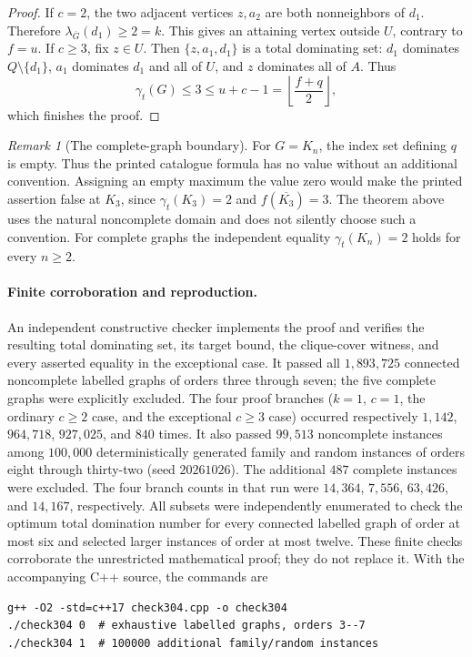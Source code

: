 \documentclass[11pt,a4paper]{article}
\theoremstyle{remark}
\newtheorem{remark}[theorem]{Remark}
\begin{document}
\begin{proof}
If $c=2$, the two adjacent vertices $z,a_2$ are both
nonneighbors of $d_1$. Therefore
$\lambda_{\overline G}(d_1)\ge2=k$. This gives an attaining
vertex outside $U$, contrary to $f=u$.
If $c\ge3$, fix $z\in U$. Then $\{z,a_1,d_1\}$ is a total
dominating set: $d_1$ dominates $Q\setminus\{d_1\}$,
$a_1$ dominates $d_1$ and all of $U$, and $z$ dominates all
of $A$. Thus
\[
 \gamma_t(G)\le3\le u+c-1
   =\left\lfloor\frac{f+q}{2}\right\rfloor,
\]
which finishes the proof.
\end{proof}

\begin{remark}[The complete-graph boundary]
For $G=K_n$, the index set defining $q$ is empty. Thus the
printed catalogue formula has no value without an additional
convention. Assigning an empty maximum the value zero would make
the printed assertion false at $K_3$, since $\gamma_t(K_3)=2$
and $f(\overline{K_3})=3$. The theorem above uses the natural
noncomplete domain and does not silently choose such a convention.
For complete graphs the independent equality $\gamma_t(K_n)=2$
holds for every $n\ge2$.
\end{remark}

\paragraph{Finite corroboration and reproduction.}
An independent constructive checker implements the proof and verifies the
resulting total dominating set, its target bound, the clique-cover witness,
and every asserted equality in the exceptional case. It passed all
$1{,}893{,}725$ connected noncomplete labelled graphs of orders three
through seven; the five complete graphs were explicitly excluded.
The four proof branches ($k=1$, $c=1$, the ordinary $c\ge2$ case,
and the exceptional $c\ge3$ case) occurred respectively
$1{,}142$, $964{,}718$, $927{,}025$, and $840$ times.
It also passed $99{,}513$ noncomplete instances among $100{,}000$
deterministically generated family and random instances of orders eight
through thirty-two (seed $20261026$). The additional $487$ complete
instances were excluded. The four branch counts in that run were
$14{,}364$, $7{,}556$, $63{,}426$, and $14{,}167$, respectively.
All subsets were independently enumerated to check the optimum total
domination number for every connected labelled graph of order at most
six and selected larger instances of order at most twelve. These finite
checks corroborate the unrestricted mathematical proof; they do not
replace it. With the accompanying C++ source, the commands are
\begin{verbatim}
g++ -O2 -std=c++17 check304.cpp -o check304
./check304 0  # exhaustive labelled graphs, orders 3--7
./check304 1  # 100000 additional family/random instances
\end{verbatim}
\end{document}
